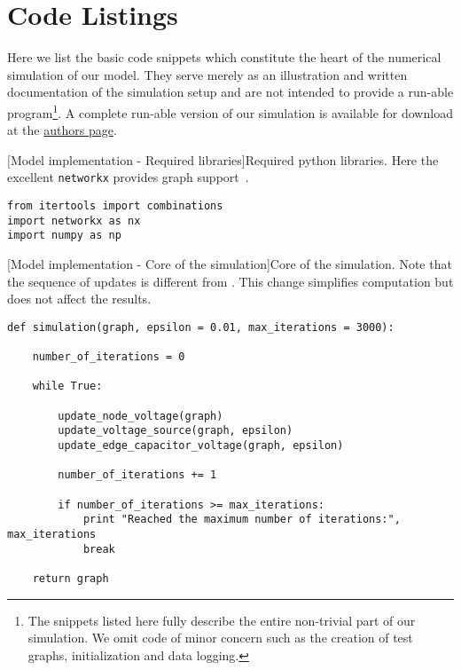 
\chapter{Code Listings}\label{app:code}

	Here we list the basic code snippets which constitute the heart of the numerical simulation of our model. They serve merely as an illustration and written documentation of the simulation setup and are not intended to provide a run-able program\footnote{The snippets listed here fully describe the entire non-trivial part of our simulation. We omit code of minor concern such as the creation of test graphs, initialization and data logging.}. A complete run-able version of our simulation is available for download at the \href{https://people.mpi-inf.mpg.de/~mtd/}{authors page}.

\begin{codesnippet}

[Model implementation - Required libraries]{Required python libraries.  Here the excellent \texttt{networkx} provides graph support~\cite{networkx}.}
\label{code:libaries}

\begin{verbatim}
from itertools import combinations
import networkx as nx
import numpy as np
\end{verbatim}

\end{codesnippet}


\begin{codesnippet}
[Model implementation - Core of the simulation]{Core of the simulation. Note that the sequence of updates is different from . This change simplifies computation but does not affect the results.}
\label{code:simulation}
\begin{verbatim}
def simulation(graph, epsilon = 0.01, max_iterations = 3000):

	number_of_iterations = 0

	while True:
		
		update_node_voltage(graph)
		update_voltage_source(graph, epsilon)
		update_edge_capacitor_voltage(graph, epsilon)
		
		number_of_iterations += 1	

		if number_of_iterations >= max_iterations:
			print "Reached the maximum number of iterations:", max_iterations
			break

	return graph
\end{verbatim}

\end{codesnippet}


